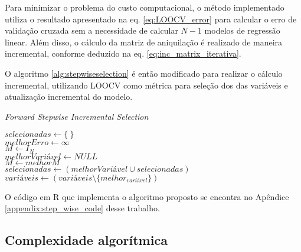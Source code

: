 Para minimizar o problema do custo computacional, o método implementado utiliza o resultado apresentado na eq. \ref{eq:LOOCV_error} para calcular o erro de validação cruzada sem a necessidade de calcular $N-1$ modelos de regressão linear. Além disso, o cálculo da matriz de aniquilação é realizado de maneira incremental, conforme deduzido na eq. \ref{eq:inc_matrix_iterativa}.

O algoritmo \ref{alg:stepwiseselection} é então modificado para realizar o cálculo incremental, utilizando LOOCV como métrica para seleção dos das variáveis e atualização incremental do modelo.

\qquad

\begin{algorithm}[H]
    \caption{\textit{Forward Stepwise Incremental Selection}}
    
    $selecionadas \gets \{\ \}$ \\
    $melhorErro \gets \infty$ \\
    $M \gets I_N$ \\

    { 
        $melhorVariável \gets NULL$ \\
        $M \gets melhorM $ \\
        $selecionadas \gets (melhorVariável \cup selecionadas)$ \\
        $variáveis \gets (variáveis \setminus \{melhor_{variável}\})$ \\
    }
    \label{alg:incstepwiseselection}
\end{algorithm}

O código em R que implementa o algoritmo proposto se encontra no Apêndice \ref{appendix:step_wise_code} desse trabalho.

\subsection{Complexidade algorítmica}


